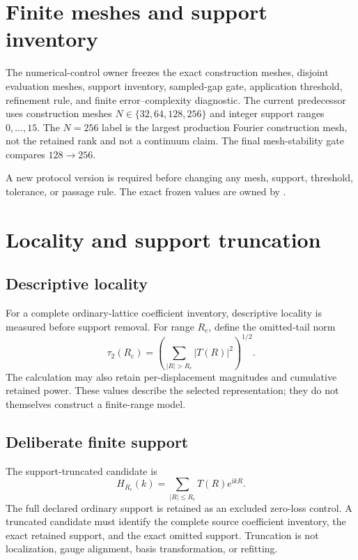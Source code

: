 \documentclass[11pt]{article}
\newcommand{\ii}{\mathrm{i}}
\newcommand{\Rc}{R_{\mathrm{c}}}
\begin{document}
\section{Finite meshes and support inventory}

The numerical-control owner freezes the exact construction meshes, disjoint evaluation
meshes, support inventory, sampled-gap gate, application threshold, refinement rule, and
finite error--complexity diagnostic.  The current predecessor uses construction meshes
$N\in\{32,64,128,256\}$ and integer support ranges $0,\ldots,15$.  The $N=256$ label is
the largest production Fourier construction mesh, not the retained rank and not a
continuum claim.  The final mesh-stability gate compares $128\to256$.

A new protocol version is required before changing any mesh, support, threshold,
tolerance, or passage rule.  The exact frozen values are owned by
.

\section{Locality and support truncation}

\subsection{Descriptive locality}

For a complete ordinary-lattice coefficient inventory, descriptive locality is measured
before support removal.  For range $\Rc$, define the omitted-tail norm
\begin{equation}
  \tau_2(\Rc)
  =\left(\sum_{|R|>\Rc}|T(R)|^2\right)^{1/2}.
\end{equation}
The calculation may also retain per-displacement magnitudes and cumulative retained
power.  These values describe the selected representation; they do not themselves
construct a finite-range model.

\subsection{Deliberate finite support}

The support-truncated candidate is
\begin{equation}
  H_{\Rc}(k)=\sum_{|R|\le\Rc}T(R)e^{\ii kR}.
\end{equation}
The full declared ordinary support is retained as an excluded zero-loss control.  A
truncated candidate must identify the complete source coefficient inventory, the exact
retained support, and the exact omitted support.  Truncation is not localization, gauge
alignment, basis transformation, or refitting.
\end{document}
